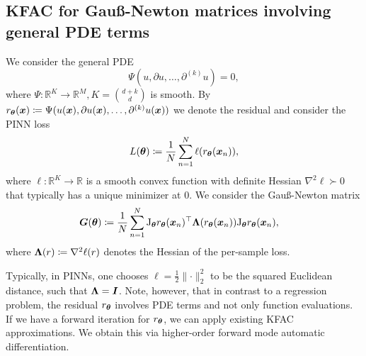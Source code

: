 \subsection{KFAC for Gauß-Newton matrices involving general PDE terms} \label{sec:KFAC-general}
We consider the general %
PDE
\begin{equation}
    \Psi(u, \partial u, \dots, \partial^{(k)} u) = 0,
\end{equation}
where $\Psi\colon \mathbb R^{K}\to\mathbb R^M,K=\binom{d+k}{d}$ is smooth. 
By $r_\vtheta(\vx)\coloneqq \Psi(u(\vx), \partial u(\vx), \dots, \partial^{(k)} u(\vx))%
$ %
we denote the residual and consider the PINN loss
\begin{equation}
    L({\bm{\theta}})\coloneqq \frac1N\sum_{n=1}^N \ell(r_{{\bm{\theta}}}({\bm{x}}_n)),
\end{equation}
where $\ell\colon\mathbb R^K\to\mathbb R$ is a smooth convex function with definite Hessian $\nabla^2\ell\succ0$ that typically has a unique minimizer at $0$. 
We consider the Gauß-Newton matrix
\begin{align}
    {\bm{G}}({\bm{\theta}}) & \coloneqq \frac1N\sum_{n=1}^N \mathrm{J}_{\bm{\theta}} r_{\bm{\theta}}({\bm{x}}_n)^\top {\bm{\Lambda}}(r_{\bm{\theta}}({\bm{x}}_n)) \mathrm{J}_{\bm{\theta}} r_{\bm{\theta}}({\bm{x}}_n),
\end{align}
where ${\bm{\Lambda}}(r)\coloneqq \nabla^2 \ell(r)$ denotes the Hessian of the per-sample loss. %

Typically, in PINNs, one chooses $\ell = \frac12\lVert \cdot \rVert_2^2$ to be the squared Euclidean distance, such that ${\bm{\Lambda}} = {\bm{I}}$.
Note, however, that in contrast to a regression problem, the residual $r_{\bm{\theta}}$ involves PDE terms and not only function evaluations.
If we have a forward iteration for $r_{\bm{\theta}}$, we can apply existing KFAC approximations.
We obtain this via higher-order forward mode automatic differentiation.


